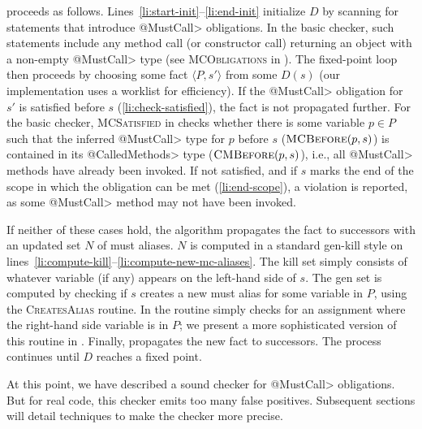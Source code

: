  proceeds as follows.
Lines~\ref{li:start-init}--\ref{li:end-init} initialize $D$ by scanning for
statements that introduce \<@MustCall> obligations.  In the basic checker, such
statements include any method call (or constructor call) returning an object
with a non-empty \<@MustCall> type (see \textsc{MCObligations} in
).  The fixed-point loop then proceeds by choosing some fact
$\langle P, s' \rangle$ from some $D(s)$ (our implementation uses a worklist for
efficiency).  If the \<@MustCall> obligation for $s'$ is satisfied before $s$
(\cref{li:check-satisfied}), the fact is not propagated further. For the basic
checker, \textsc{MCSatisfied} in  checks whether there is some
variable $p \in P$ such that the inferred \<@MustCall> type for $p$ before $s$
($\textsc{MCBefore}(p,s)$) is contained in its \<@CalledMethods> type
($\textsc{CMBefore}(p,s)$), i.e., all \<@MustCall> methods have already been
invoked.
If not satisfied, and if $s$ marks the end of the scope in which the
obligation can be met (\cref{li:end-scope}), a violation is reported, as some
\<@MustCall> method may not have been invoked.

If neither of these cases hold, the algorithm propagates the fact to
successors with an updated set $N$ of must aliases.  $N$ is computed in a
standard gen-kill style on
lines~\ref{li:compute-kill}--\ref{li:compute-new-mc-aliases}.  The kill set
simply consists of whatever variable (if any) appears on the left-hand side of
$s$.  The gen set is computed by checking if $s$ creates a new must alias for
some variable in $P$, using the \textsc{CreatesAlias} routine.  In
 the routine simply checks for an assignment where the
right-hand side variable is in $P$; we present a more sophisticated version of
this routine in . 
Finally,  propagates the new fact to successors.  The
process continues until $D$ reaches a fixed point.  

At this point, we have described a sound checker for \<@MustCall> obligations.
But for real code, this checker emits too many false positives.  Subsequent
sections will detail techniques to make the checker more precise.


